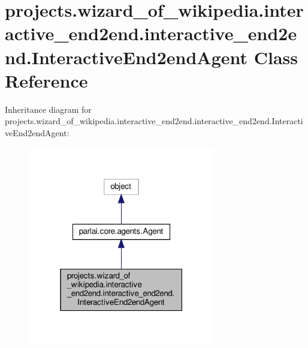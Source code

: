 \hypertarget{classprojects_1_1wizard__of__wikipedia_1_1interactive__end2end_1_1interactive__end2end_1_1InteractiveEnd2endAgent}{}\section{projects.\+wizard\+\_\+of\+\_\+wikipedia.\+interactive\+\_\+end2end.\+interactive\+\_\+end2end.\+Interactive\+End2end\+Agent Class Reference}
\label{classprojects_1_1wizard__of__wikipedia_1_1interactive__end2end_1_1interactive__end2end_1_1InteractiveEnd2endAgent}


Inheritance diagram for projects.\+wizard\+\_\+of\+\_\+wikipedia.\+interactive\+\_\+end2end.\+interactive\+\_\+end2end.\+Interactive\+End2end\+Agent\+:
\nopagebreak
\begin{figure}[H]
\begin{center}
\leavevmode
\includegraphics[width=232pt]{d1/dae/classprojects_1_1wizard__of__wikipedia_1_1interactive__end2end_1_1interactive__end2end_1_1Intera7f68781f07fc62f0d5ec728a6092461d}
\end{center}
\end{figure}



